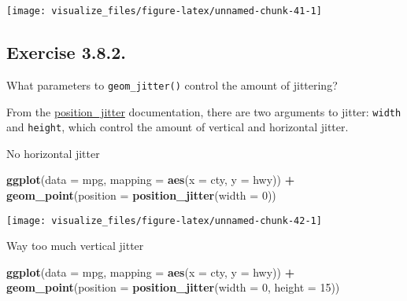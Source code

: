 \documentclass[]{book}
\newenvironment{Shaded}{\begin{snugshade}}{\end{snugshade}}
\newcommand{\DataTypeTok}[1]{\textcolor[rgb]{0.13,0.29,0.53}{#1}}
\newcommand{\DecValTok}[1]{\textcolor[rgb]{0.00,0.00,0.81}{#1}}
\newcommand{\KeywordTok}[1]{\textcolor[rgb]{0.13,0.29,0.53}{\textbf{#1}}}
\newcommand{\NormalTok}[1]{#1}
\newcommand{\OperatorTok}[1]{\textcolor[rgb]{0.81,0.36,0.00}{\textbf{#1}}}
\newcommand{\StringTok}[1]{\textcolor[rgb]{0.31,0.60,0.02}{#1}}
\theoremstyle{plain}
\theoremstyle{remark}
\theoremstyle{definition}
\theoremstyle{definition}
\theoremstyle{definition}
\theoremstyle{remark}
\begin{document}
\begin{center}\texttt{[image: visualize\_files/figure-latex/unnamed-chunk-41-1]} \end{center}

\hypertarget{exercise-3.8.2.}{%
\subsection*{\texorpdfstring{Exercise
{3.8.2}.}{Exercise 3.8.2.}}\label{exercise-3.8.2.}}

What parameters to \texttt{geom\_jitter()} control the amount of
jittering?

From the
\href{http://docs.ggplot2.org/current/position_jitter.html}{position\_jitter}
documentation, there are two arguments to jitter: \texttt{width} and
\texttt{height}, which control the amount of vertical and horizontal
jitter.

No horizontal jitter

\begin{Shaded}
\begin{Highlighting}[]
\KeywordTok{ggplot}\NormalTok{(}\DataTypeTok{data =}\NormalTok{ mpg, }\DataTypeTok{mapping =} \KeywordTok{aes}\NormalTok{(}\DataTypeTok{x =}\NormalTok{ cty, }\DataTypeTok{y =}\NormalTok{ hwy)) }\OperatorTok{+}
\StringTok{  }\KeywordTok{geom_point}\NormalTok{(}\DataTypeTok{position =} \KeywordTok{position_jitter}\NormalTok{(}\DataTypeTok{width =} \DecValTok{0}\NormalTok{))}
\end{Highlighting}
\end{Shaded}

\begin{center}\texttt{[image: visualize\_files/figure-latex/unnamed-chunk-42-1]} \end{center}

Way too much vertical jitter

\begin{Shaded}
\begin{Highlighting}[]
\KeywordTok{ggplot}\NormalTok{(}\DataTypeTok{data =}\NormalTok{ mpg, }\DataTypeTok{mapping =} \KeywordTok{aes}\NormalTok{(}\DataTypeTok{x =}\NormalTok{ cty, }\DataTypeTok{y =}\NormalTok{ hwy)) }\OperatorTok{+}
\StringTok{  }\KeywordTok{geom_point}\NormalTok{(}\DataTypeTok{position =} \KeywordTok{position_jitter}\NormalTok{(}\DataTypeTok{width =} \DecValTok{0}\NormalTok{, }\DataTypeTok{height =} \DecValTok{15}\NormalTok{))}
\end{Highlighting}
\end{Shaded}
\end{document}
